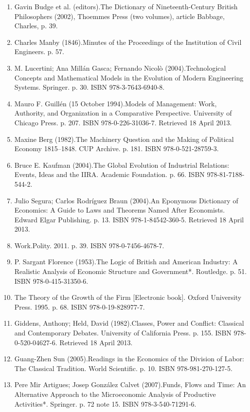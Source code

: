 \begin{enumerate}
\item Gavin Budge et al. (editors).The Dictionary of Nineteenth-Century British Philosophers (2002), Thoemmes Press (two volumes), article Babbage, Charles, p. 39.
\item Charles Manby (1846).Minutes of the Proceedings of the Institution of Civil Engineers. p. 57.
\item M. Lucertini; Ana Millán Gasca; Fernando Nicolò (2004).Technological Concepts and Mathematical Models in the Evolution of Modern Engineering Systems. Springer. p. 30. ISBN 978-3-7643-6940-8.
\item Mauro F. Guillén (15 October 1994).Models of Management: Work, Authority, and Organization in a Comparative Perspective. University of Chicago Press. p. 207. ISBN 978-0-226-31036-7. Retrieved 18 April 2013.
\item Maxine Berg (1982).The Machinery Question and the Making of Political Economy 1815–1848. CUP Archive. p. 181. ISBN 978-0-521-28759-3.
\item Bruce E. Kaufman (2004).The Global Evolution of Industrial Relations: Events, Ideas and the IIRA. Academic Foundation. p. 66. ISBN 978-81-7188-544-2.
\item Julio Segura; Carlos Rodríguez Braun (2004).An Eponymous Dictionary of Economics: A Guide to Laws and Theorems Named After Economists. Edward Elgar Publishing. p. 13. ISBN 978-1-84542-360-5. Retrieved 18 April 2013.
\item Work.Polity. 2011. p. 39. ISBN 978-0-7456-4678-7.
\item P. Sargant Florence (1953).The Logic of British and American Industry: A Realistic Analysis of Economic Structure and Government*. Routledge. p. 51. ISBN 978-0-415-31350-6.
\item The Theory of the Growth of the Firm [Electronic book]. Oxford University Press. 1995. p. 68. ISBN 978-0-19-828977-7.
\item Giddens, Anthony; Held, David (1982).Classes, Power and Conflict: Classical and Contemporary Debates. University of California Press. p. 155. ISBN 978-0-520-04627-6. Retrieved 18 April 2013.
\item Guang-Zhen Sun (2005).Readings in the Economics of the Division of Labor: The Classical Tradition. World Scientific. p. 10. ISBN 978-981-270-127-5.
\item Pere Mir Artigues; Josep González Calvet (2007).Funds, Flows and Time: An Alternative Approach to the Microeconomic Analysis of Productive Activities*. Springer. p. 72 note 15. ISBN 978-3-540-71291-6.

\end{enumerate}
